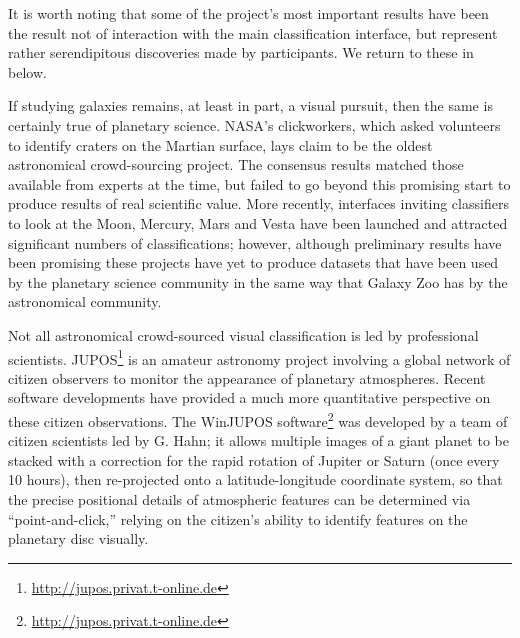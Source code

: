\documentclass{ar2e}
\begin{document}
It is worth noting that some of the project's most important results
have been the result not of interaction with the main classification interface,
but represent rather serendipitous discoveries made by participants. 
We return to these in  below.




If studying galaxies remains, at least in part, a visual pursuit, then the same
is certainly true of planetary science. NASA's clickworkers, which asked
volunteers to identify craters on the Martian surface, lays claim to be the
oldest astronomical crowd-sourcing project. The consensus results matched those
available from experts at the time, but failed to go beyond this promising start
to produce results of real scientific value. More recently, interfaces inviting
classifiers to look at the Moon, Mercury, Mars and Vesta have been launched and
attracted significant numbers of classifications; however, although preliminary
results have been promising these projects have yet to produce datasets that
have been used by the planetary science community in the same way that Galaxy
Zoo has by the astronomical community. 




Not all astronomical crowd-sourced visual classification is led by 
professional scientists.
JUPOS\footnote{\url{http://jupos.privat.t-online.de}} is an amateur astronomy
project involving a global network of citizen observers to monitor the
appearance of planetary atmospheres.  Recent software developments have provided
a much more quantitative perspective on these citizen observations. The WinJUPOS
software\footnote{\url{http://jupos.privat.t-online.de}} was developed by a team
of citizen scientists led by G. Hahn; it allows multiple images of a giant
planet to be stacked with a correction for the rapid rotation of Jupiter or
Saturn  (once every 10 hours), then re-projected onto a latitude-longitude
coordinate system, so that the precise positional details of atmospheric
features can be determined via ``point-and-click,'' relying on the citizen's
ability to identify features on the planetary disc visually.  
\end{document}
